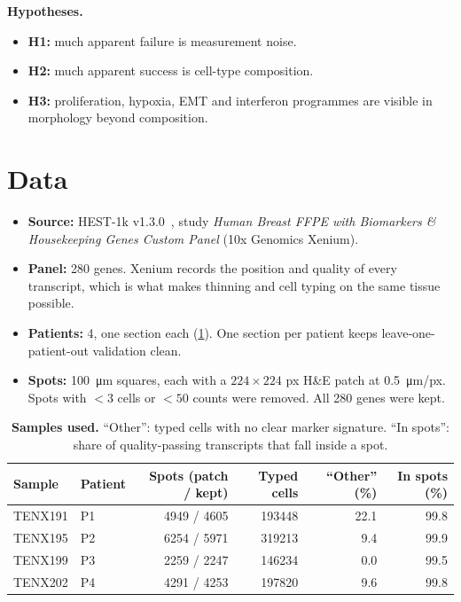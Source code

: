 \documentclass[11pt,a4paper]{article}
\begin{document}
\textbf{Hypotheses.}
\begin{itemize}
  \item \textbf{H1:} much apparent failure is measurement noise.
  \item \textbf{H2:} much apparent success is cell-type composition.
  \item \textbf{H3:} proliferation, hypoxia, EMT and interferon programmes are visible in morphology beyond composition.
\end{itemize}

\section{Data}
\label{sec:data}

\begin{itemize}
  \item \textbf{Source:} HEST-1k v1.3.0~\cite{jaume2024hest}, study \textit{Human Breast FFPE with Biomarkers \& Housekeeping Genes Custom Panel} (10x Genomics Xenium).
  \item \textbf{Panel:} 280 genes. Xenium records the position and quality of every transcript, which is what makes thinning and cell typing on the same tissue possible.
  \item \textbf{Patients:} 4, one section each (\cref{tab:samples}). One section per patient keeps leave-one-patient-out validation clean.
  \item \textbf{Spots:} \SI{100}{\micro\metre} squares, each with a $224\times224$ px H\&E patch at \SI{0.5}{\micro\metre}/px. Spots with $<3$ cells or $<50$ counts were removed. All 280 genes were kept.
\end{itemize}

\begin{table}[h]
\centering
\caption{\textbf{Samples used.} ``Other'': typed cells with no clear marker signature. ``In spots'': share of quality-passing transcripts that fall inside a spot.}
\label{tab:samples}
\begin{tabular}{llrrrr}
\toprule
Sample & Patient & Spots (patch / kept) & Typed cells & ``Other'' (\%) & In spots (\%) \\
\midrule
TENX191 & P1 & \num{4949} / \num{4605} & \num{193448} & 22.1 & 99.8 \\
TENX195 & P2 & \num{6254} / \num{5971} & \num{319213} &  9.4 & 99.9 \\
TENX199 & P3 & \num{2259} / \num{2247} & \num{146234} &  0.0 & 99.5 \\
TENX202 & P4 & \num{4291} / \num{4253} & \num{197820} &  9.6 & 99.8 \\
\bottomrule
\end{tabular}
\end{table}
\end{document}
